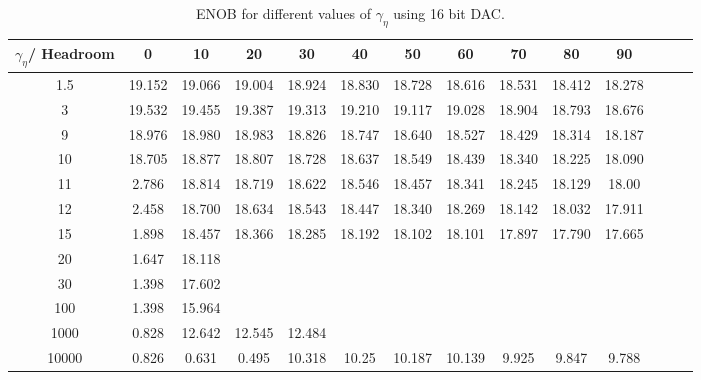 \documentclass[a4paper]{article}
\begin{document}
\begin{table}[!h]
	\caption{ENOB for different values of $\gamma_{\eta}$ using 16 bit DAC.}
	\centering
	\begin{tabular}{|c|c|c|c|c|c|c|c|c|c|c|c|c|c|}
	\hline
	 $\gamma_{\eta}$/ Headroom&0  & 10 & 20 & 30 & 40 &50 & 60 & 70 & 80 & 90  \\
        \hline
        1.5 & 19.152 & 19.066 & 19.004 & 18.924 & 18.830 &18.728 & 18.616 & 18.531 & 18.412 & 18.278  \\
	\hline
	 3 & 19.532 & 19.455 & 19.387 & 19.313 & 19.210 &19.117 & 19.028 & 18.904 & 18.793 & 18.676  \\
	\hline
	 9 & 18.976 & 18.980 & 18.983 & 18.826 & 18.747 &18.640 & 18.527 & 18.429 & 18.314 & 18.187  \\
	 \hline
	 10 & 18.705 & 18.877 &18.807 & 18.728 & 18.637 &18.549 & 18.439 & 18.340 & 18.225 & 18.090  \\
	 \hline
  11 & 2.786 & 18.814 &18.719 & 18.622 & 18.546 &18.457 & 18.341 & 18.245 & 18.129 & 18.00  \\
	 \hline
  12 & 2.458 & 18.700 &18.634 & 18.543 & 18.447 &18.340 & 18.269 & 18.142 & 18.032 & 17.911  \\
	 \hline
   15 & 1.898 & 18.457 &18.366 & 18.285 & 18.192 &18.102 & 18.101 & 17.897 & 17.790 & 17.665  \\
	 \hline
  20 & 1.647 & 18.118 & &  &  & &  & &  &  \\
	 \hline
 30 & 1.398 & 17.602 & &  &  & &  & &  &  \\
	 \hline
   100 & 1.398 & 15.964 & &  &  & &  & &  &  \\
	 \hline
     1000 & 0.828 & 12.642 &12.545& 12.484 &  & &  & &  &  \\
	 \hline
   10000 & 0.826 & 0.631 & 0.495 & 10.318 &10.25  &10.187 & 10.139 & 9.925 & 9.847 & 9.788 \\
	 \hline
	\end{tabular}		
\end{table}
\end{document}
